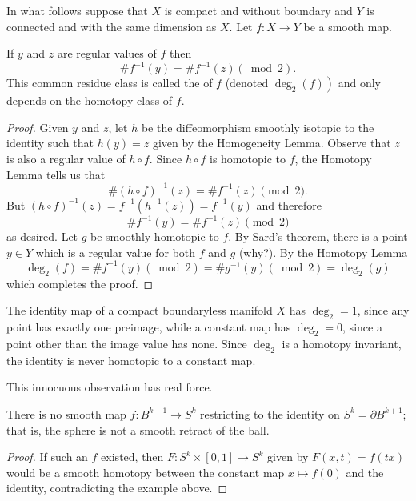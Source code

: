 In what follows suppose that $X$ is compact and without boundary and $Y$ is connected and with the same dimension as $X$. Let $f: X \rightarrow Y$ be a smooth map.

\begin{theorem}
    If $y$ and $z$ are regular values of $f$ then
    $$
    \# f^{-1}(y)=\# f^{-1}(z)(\bmod 2).
    $$
    This common residue class is called the  of $f$ (denoted $\left.\operatorname{deg}_{2}(f)\right)$ and only depends on the homotopy class of $f$.
\end{theorem}
\begin{proof}
    Given $y$ and $z$, let $h$ be the diffeomorphism smoothly isotopic to the identity such that $h(y)=z$ given by the Homogeneity Lemma. Observe that $z$ is also a regular value of $h \circ f$. Since $h \circ f$ is homotopic to $f$, the Homotopy Lemma tells us that
$$
\#(h \circ f)^{-1}(z)=\# f^{-1}(z) \pmod 2.
$$
But $(h \circ f)^{-1}(z)=f^{-1}\left(h^{-1}(z)\right)=f^{-1}(y)$ and therefore
$$
\# f^{-1}(y)=\# f^{-1}(z) \pmod 2
$$
as desired. Let $g$ be smoothly homotopic to $f$. By Sard's theorem, there is a point $y \in Y$ which is a regular value for both $f$ and $g$ (why?). By the Homotopy Lemma
$$
\operatorname{deg}_{2}(f)=\# f^{-1}(y)(\bmod 2)=\# g^{-1}(y)(\bmod 2)=\operatorname{deg}_{2}(g)
$$
which completes the proof. 
\end{proof}

\begin{example}
    The identity map of a compact boundaryless manifold $X$ has $\operatorname{deg}_2 = 1$, since any point has exactly one preimage, while a constant map has $\operatorname{deg}_2 = 0$, since a point other than the image value has none. Since $\deg_2$ is a homotopy invariant, the identity is never homotopic to a constant map.
\end{example}

This innocuous observation has real force.

\begin{corollary}\label{cor:noretraction}
    There is no smooth map $f: B^{k+1} \rightarrow S^{k}$ restricting to the identity on $S^k = \partial B^{k+1}$; that is, the sphere is not a smooth retract of the ball.
\end{corollary}
\begin{proof}
    If such an $f$ existed, then $F: S^{k}\times[0,1] \rightarrow S^{k}$ given by $F(x,t) = f(tx)$ would be a smooth homotopy between the constant map $x \mapsto f(0)$ and the identity, contradicting the example above.
\end{proof}

